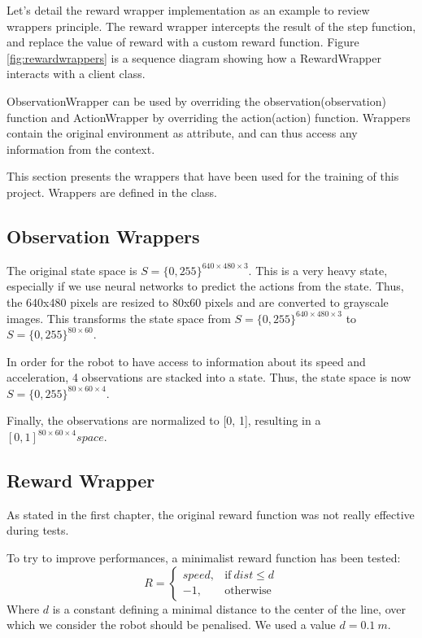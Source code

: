 Let's detail the reward wrapper implementation as an example to review wrappers principle.
The reward wrapper intercepts the result of the step function, and replace the value of reward with a custom reward function.
Figure \ref{fig:rewardwrappers} is a sequence diagram showing how a RewardWrapper interacts with a client class.

ObservationWrapper can be used by overriding the observation(observation) function and ActionWrapper by overriding the action(action) function.
Wrappers contain the original environment as attribute, and can thus access any information from the context.

This section presents the wrappers that have been used for the training of this project.
Wrappers are defined in the  class.

\subsection{Observation Wrappers}
The original state space is $S = \{ 0, 255 \}^{640\times480\times3}$.
This is a very heavy state, especially if we use neural networks to predict the actions from the state.
Thus, the 640x480 pixels are resized to 80x60 pixels and are converted to grayscale images.
This transforms the state space from $S = \{ 0, 255 \}^{640\times480\times3}$ to $S = \{ 0, 255 \}^{80\times60}$.

In order for the robot to have access to information about its speed and acceleration, 4 observations are stacked into a state.
Thus, the state space is now $S = \{ 0, 255 \}^{80\times60\times4}$.

Finally, the observations are normalized to [0, 1], resulting in a $[0, 1]^{80\times60\times4} space$.

\subsection{Reward Wrapper}

As stated in the first chapter, the original reward function was not really effective during tests.

To try to improve performances, a minimalist reward function has been tested:
\begin{equation}
    R =
    \begin{cases}
        speed, & \text{if}\ dist \leq d\\
        -1, & \text{otherwise}
    \end{cases}
\end{equation}
Where $d$ is a constant defining a minimal distance to the center of the line, over which we consider the robot should be penalised. We used a value $d=0.1\ m$.

